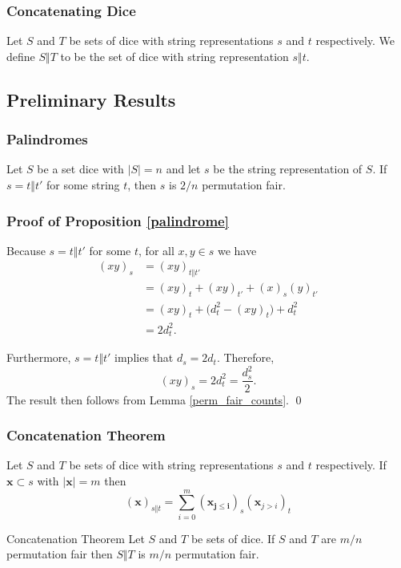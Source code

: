 \documentclass[aspectratio=169]{beamer}
\begin{document}
\begin{frame}[triangle=siiblue]
\frametitle{Concatenating Dice}
\begin{siidefinition}{}{}
Let $S$ and $T$ be sets of dice with string representations $s$ and $t$ respectively.   We define $S \Vert T$ to be the set of dice with string representation $s \Vert t$. 
\end{siidefinition}
\end{frame}

\subsection{Preliminary Results}
\begin{frame}[triangle=siiblue]
\frametitle{Palindromes}
\begin{siiproposition}[label=palindrome]{}{}
Let $S$ be a set dice with $|S| = n$ and let $s$ be the string representation of $S$.  If $s = t \Vert t'$ for some string $t$,  then $s$ is $2/n$ permutation fair. 
\end{siiproposition}
\end{frame}

\begin{frame}[triangle=siiblue]
\frametitle{Proof of Proposition \ref{palindrome}}
Because $s = t \Vert t'$ for some $t$, for all $x,y \in s$ we have 
\begin{equation}\nonumber
\begin{split}
(xy)_s &= (xy)_{t \Vert t'} \\
&= (xy)_t + (xy)_{t'} + (x)_s(y)_{t'} \\
&= (xy)_t + \big(d_t^2 - (xy)_t\big) + d_t^2 \\
&= 2d_t^2.
\end{split}
\end{equation}

\vfill

Furthermore, $s = t \Vert t'$ implies that $d_s = 2d_t$. Therefore,
\begin{equation*}
(xy)_s = 2d_t^2 = \frac{d_s^2}{2}.
\end{equation*}
The result then follows from Lemma \ref{perm_fair_counts}. \qed
\end{frame}


\begin{frame}[triangle=siiblue]
\frametitle{Concatenation Theorem}
\begin{siilemma}[label=perm_fair_cat_counts]{}{}
Let $S$ and $T$ be sets of dice with string representations $s$ and $t$ respectively. If $\mathbf{x} \subset s$ with $|\mathbf{x}| = m$ then
\begin{equation*}
(\mathbf{x})_{s \Vert t} = \sum_{i=0}^{m} (\mathbf{x_{j \leq i}})_s (\mathbf{x}_{j > i})_t
\end{equation*}
\end{siilemma}

\vfill
 
\begin{siitheorem}[label=mn_perm_fair]{Concatenation Theorem}{}
Let $S$ and $T$ be sets of dice. If $S$ and $T$ are $m/n$ permutation fair then $S \Vert T$ is $m/n$ permutation fair.
\end{siitheorem}
\end{frame}
\end{document}
